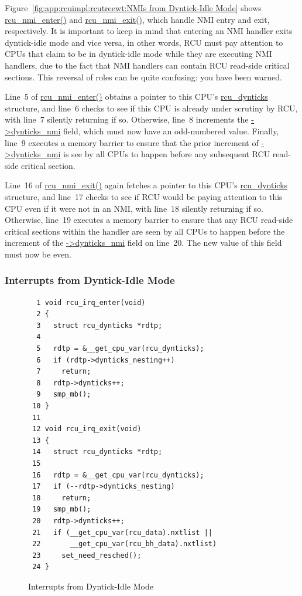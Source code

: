 Figure~\ref{fig:app:rcuimpl:rcutreewt:NMIs from Dyntick-Idle Mode}
shows \url{rcu_nmi_enter()} and \url{rcu_nmi_exit()}, which handle
NMI entry and exit, respectively.
It is important to keep in mind that entering an NMI handler
exits dyntick-idle mode and vice versa, in other words, RCU must
pay attention to CPUs that claim to be in dyntick-idle mode while
they are executing NMI handlers, due to the fact that NMI handlers
can contain RCU read-side critical sections.
This reversal of roles can be quite confusing: you have been warned.

Line~5 of \url{rcu_nmi_enter()} obtains a pointer to this CPU's
\url{rcu_dynticks} structure, and line~6 checks to see if this
CPU is already under scrutiny by RCU, with line~7 silently returning
if so.
Otherwise, line~8 increments the \url{->dynticks_nmi} field, which
must now have an odd-numbered value.
Finally, line~9 executes a memory barrier to ensure that the prior
increment of \url{->dynticks_nmi} is see by all CPUs to happen
before any subsequent RCU read-side critical section.

Line~16 of \url{rcu_nmi_exit()} again fetches a pointer to this CPU's
\url{rcu_dynticks} structure, and line~17 checks to see if RCU would
be paying attention to this CPU even if it were not in an NMI,
with line~18 silently returning if so.
Otherwise, line~19 executes a memory barrier to ensure that any
RCU read-side critical sections within the handler are seen by all
CPUs to happen before the increment of the \url{->dynticks_nmi} field
on line~20.
The new value of this field must now be even.

 \QuickQuizEnd

\subsubsection{Interrupts from Dyntick-Idle Mode}
\label{app:rcuimpl:rcutreewt:Interrupts from Dyntick-Idle Mode}

\begin{figure}[tbp]
{ \scriptsize
\begin{verbatim}
  1 void rcu_irq_enter(void)
  2 {
  3   struct rcu_dynticks *rdtp;
  4 
  5   rdtp = &__get_cpu_var(rcu_dynticks);
  6   if (rdtp->dynticks_nesting++)
  7     return;
  8   rdtp->dynticks++;
  9   smp_mb();
 10 }
 11 
 12 void rcu_irq_exit(void)
 13 {
 14   struct rcu_dynticks *rdtp;
 15 
 16   rdtp = &__get_cpu_var(rcu_dynticks);
 17   if (--rdtp->dynticks_nesting)
 18     return;
 19   smp_mb();
 20   rdtp->dynticks++;
 21   if (__get_cpu_var(rcu_data).nxtlist ||
 22       __get_cpu_var(rcu_bh_data).nxtlist)
 23     set_need_resched();
 24 }
\end{verbatim}
}
\caption{Interrupts from Dyntick-Idle Mode}
\label{fig:app:rcuimpl:rcutreewt:Interrupts from Dyntick-Idle Mode}
\end{figure}

